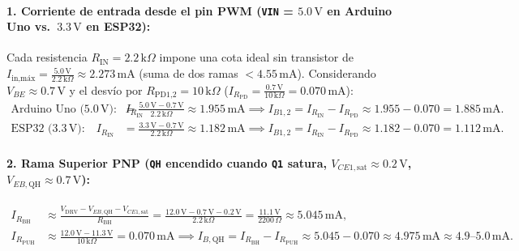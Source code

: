 \documentclass[10pt, a4paper, landscape]{article}
\begin{document}
\paragraph{1. Corriente de entrada desde el pin PWM (\texttt{VIN} = $5.0\,\text{V}$ en Arduino Uno vs.\ $3.3\,\text{V}$ en ESP32):}
Cada resistencia $R_{\text{IN}} = 2.2\,\text{k}\Omega$ impone una cota ideal sin transistor de $I_{\text{in,máx}} = \frac{5.0\,\text{V}}{2.2\,\text{k}\Omega} \approx 2.273\,\text{mA}$ (suma de dos ramas $< 4.55\,\text{mA}$). Considerando $V_{BE} \approx 0.7\,\text{V}$ y el desvío por $R_{\text{PD1,2}} = 10\,\text{k}\Omega$ ($I_{R_{\text{PD}}} = \frac{0.7\,\text{V}}{10\,\text{k}\Omega} = 0.070\,\text{mA}$):
\begin{align}
    \text{Arduino Uno ($5.0\,\text{V}$):}\quad I_{R_{\text{IN}}} &= \frac{5.0\,\text{V} - 0.7\,\text{V}}{2.2\,\text{k}\Omega} \approx 1.955\,\text{mA} \implies I_{B1,2} = I_{R_{\text{IN}}} - I_{R_{\text{PD}}} \approx 1.955 - 0.070 = 1.885\,\text{mA}. \\
    \text{ESP32 ($3.3\,\text{V}$):}\quad I_{R_{\text{IN}}} &= \frac{3.3\,\text{V} - 0.7\,\text{V}}{2.2\,\text{k}\Omega} \approx 1.182\,\text{mA} \implies I_{B1,2} = I_{R_{\text{IN}}} - I_{R_{\text{PD}}} \approx 1.182 - 0.070 = 1.112\,\text{mA}.
\end{align}

\paragraph{2. Rama Superior PNP (\texttt{QH} encendido cuando \texttt{Q1} satura, $V_{CE1,\text{sat}} \approx 0.2\,\text{V}$, $V_{EB,\text{QH}} \approx 0.7\,\text{V}$):}
\begin{align}
    I_{R_{\text{BH}}} &\approx \frac{V_{\text{DRV}} - V_{EB,\text{QH}} - V_{CE1,\text{sat}}}{R_{\text{BH}}} = \frac{12.0\,\text{V} - 0.7\,\text{V} - 0.2\,\text{V}}{2.2\,\text{k}\Omega} = \frac{11.1\,\text{V}}{2200\,\Omega} \approx 5.045\,\text{mA}, \\
    I_{R_{\text{PUH}}} &\approx \frac{12.0\,\text{V} - 11.3\,\text{V}}{10\,\text{k}\Omega} = 0.070\,\text{mA} \implies I_{B,\text{QH}} = I_{R_{\text{BH}}} - I_{R_{\text{PUH}}} \approx 5.045 - 0.070 \approx 4.975\,\text{mA} \approx 4.9\text{--}5.0\,\text{mA}.
\end{align}
\end{document}
